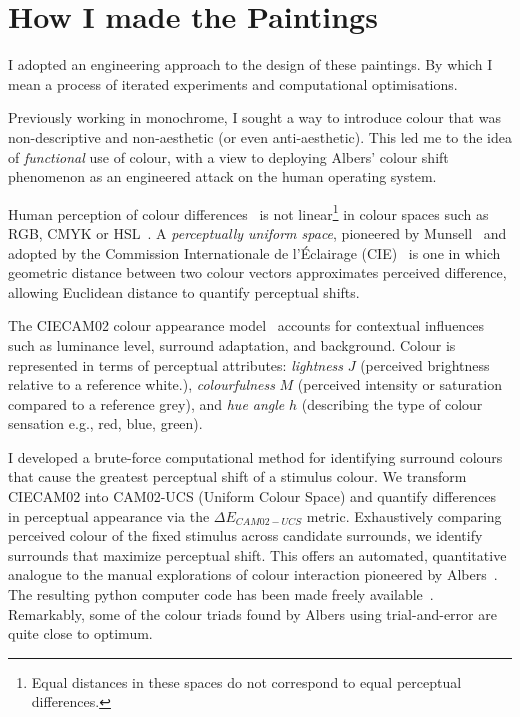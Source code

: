 \documentclass[12pt]{article}
\begin{document}
\section{How I made the Paintings}\label{sec:process}
I adopted an engineering approach to the design of these paintings. By
which I mean a process of iterated experiments and computational
optimisations.

Previously working in monochrome, I sought a way to introduce
colour that was non-descriptive and non-aesthetic (or even
anti-aesthetic). This led me to the idea of \emph{functional} use of
colour, with a view to deploying Albers' colour shift phenomenon
as an engineered attack on the human operating system.

Human perception of colour differences~\cite{MacAdam1942} is not
linear\footnote{Equal distances in these spaces do not correspond to
  equal perceptual differences.} in colour spaces such as RGB, CMYK or
HSL~\cite{Luo2001CIECAM02}.  A \emph{perceptually uniform space},
pioneered by Munsell~\cite{Munsell1915} and adopted by the Commission
Internationale de l'\'{E}clairage
(CIE)~\cite{CIE1976,CIE1978Uniform,Luo2001CIEDE2000} is one in which
geometric distance between two colour vectors approximates perceived
difference, allowing Euclidean distance to quantify perceptual shifts.

The CIECAM02 colour appearance
model~\cite{Luo2001CIECAM02,CIE1592004} accounts for
contextual influences such as luminance level, surround adaptation,
and background. Colour is represented in terms of perceptual
attributes: \emph{lightness} $J$ (perceived brightness relative to a
reference white.), \emph{colourfulness} $M$ (perceived intensity or
saturation compared to a reference grey), and \emph{hue angle} $h$
(describing the type of colour sensation e.g., red, blue, green).

I developed a brute-force computational method for identifying
surround colours that cause the greatest perceptual shift of a
stimulus colour. We transform CIECAM02 into CAM02-UCS (Uniform Colour
Space) and quantify differences in perceptual appearance via the
$\Delta E_{CAM02-UCS}$ metric. Exhaustively comparing perceived colour
of the fixed stimulus across candidate surrounds, we identify
surrounds that maximize perceptual shift. This offers an automated,
quantitative analogue to the manual explorations of colour interaction
pioneered by Albers~\cite{albers}. The resulting python computer code
has been made freely
available~\cite{grant2025colourshift}. Remarkably, some of the colour
triads found by Albers using trial-and-error are quite close to
optimum.
\end{document}
